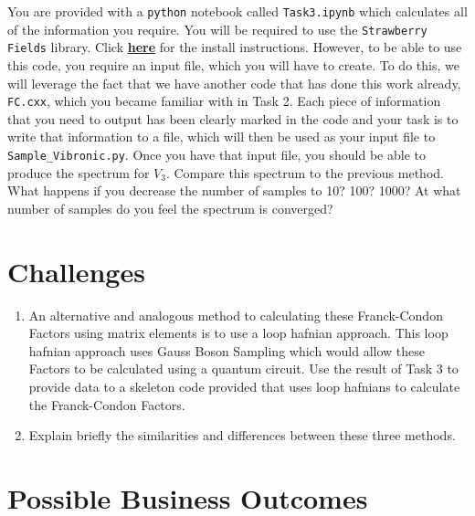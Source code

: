 \documentclass[12pt]{article}
\begin{document}
\hspace{20mm}

You are provided with a \texttt{python} notebook called \texttt{Task3.ipynb} which calculates all of the information you require. You will be required to use the \texttt{Strawberry Fields} library\cite{killoran2019strawberry, bromley2020applications}. Click  \href{https://strawberryfields.readthedocs.io/en/stable/_static/install.html}{\underline{\textbf{here}}} for the install instructions. However, to be able to use this code, you require an input file, which you will have to create. To do this, we will leverage the fact that we have another code that has done this work already, \texttt{FC.cxx}, which you became familiar with in Task 2. Each piece of information that you need to output has been clearly marked in the code and your task is to write that information to a file, which will then be used as your input file to \texttt{Sample\_Vibronic.py}. Once you have that input file, you should be able to produce the spectrum for $V_3$. Compare this spectrum to the previous method. What happens if you decrease the number of samples to 10? 100? 1000? At what number of samples do you feel the spectrum is converged?

\section*{Challenges}

\begin{enumerate}
    \item An alternative and analogous method to calculating these Franck-Condon Factors using matrix elements is to use a loop hafnian approach. This loop hafnian approach uses Gauss Boson Sampling which would allow these Factors to be calculated using a quantum circuit. Use the result of Task 3 to provide data to a skeleton code provided that uses loop hafnians to calculate the Franck-Condon Factors.
    \item Explain briefly the similarities and differences between these three methods.
\end{enumerate}

\section*{Possible Business Outcomes}
\end{document}
